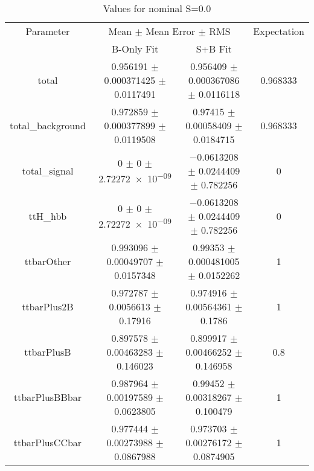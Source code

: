\begin{table}
\centering
\caption{Values for nominal S=0.0}
\begin{tabular}{cccc}
\toprule
Parameter & \multicolumn{2}{c}{Mean $\pm$ Mean Error $\pm$ RMS} & Expectation\\
 & B-Only Fit & S+B Fit & \\
\midrule
total & \num{0.956191} $\pm$ \num{0.000371425} $\pm$ \num{0.0117491} & \num{0.956409} $\pm$ \num{0.000367086} $\pm$ \num{0.0116118} & \num{0.968333}\\
total\_background & \num{0.972859} $\pm$ \num{0.000377899} $\pm$ \num{0.0119508} & \num{0.97415} $\pm$ \num{0.00058409} $\pm$ \num{0.0184715} & \num{0.968333}\\
total\_signal & \num{0} $\pm$ \num{0} $\pm$ \num{2.72272e-09} & \num{-0.0613208} $\pm$ \num{0.0244409} $\pm$ \num{0.782256} & \num{0}\\
ttH\_hbb & \num{0} $\pm$ \num{0} $\pm$ \num{2.72272e-09} & \num{-0.0613208} $\pm$ \num{0.0244409} $\pm$ \num{0.782256} & \num{0}\\
ttbarOther & \num{0.993096} $\pm$ \num{0.00049707} $\pm$ \num{0.0157348} & \num{0.99353} $\pm$ \num{0.000481005} $\pm$ \num{0.0152262} & \num{1}\\
ttbarPlus2B & \num{0.972787} $\pm$ \num{0.0056613} $\pm$ \num{0.17916} & \num{0.974916} $\pm$ \num{0.00564361} $\pm$ \num{0.1786} & \num{1}\\
ttbarPlusB & \num{0.897578} $\pm$ \num{0.00463283} $\pm$ \num{0.146023} & \num{0.899917} $\pm$ \num{0.00466252} $\pm$ \num{0.146958} & \num{0.8}\\
ttbarPlusBBbar & \num{0.987964} $\pm$ \num{0.00197589} $\pm$ \num{0.0623805} & \num{0.99452} $\pm$ \num{0.00318267} $\pm$ \num{0.100479} & \num{1}\\
ttbarPlusCCbar & \num{0.977444} $\pm$ \num{0.00273988} $\pm$ \num{0.0867988} & \num{0.973703} $\pm$ \num{0.00276172} $\pm$ \num{0.0874905} & \num{1}\\
\bottomrule
\end{tabular}
\end{table}